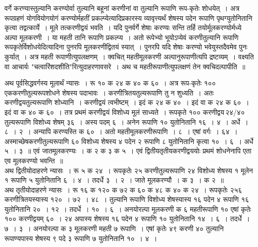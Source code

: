 \documentclass[11pt, openany]{book}
\begin{document}
 वर्गे करण्यास्तुल्यानि करण्योर्वा तुल्यानि बहूनां करणीनां वा तुल्यानि
रूपाणि रूप-कृतेः शोधयेत्~। अत्र रूपग्रहणं योगवियोगयोगं करण्योर्महतीं 
प्रकल्प्येत्यादिप्रकारस्य व्यावृत्त्यर्थं शेषस्य पदेन रूपाणि
पृथग्युतोनितानि कृत्वा तद्वत्कार्ये~। मूले तत्करणीद्वयं भवति~। यदि पुनर्वर्गे शेषाः करण्यः सन्ति तर्हि तयोर्मूलकरण्योर्मध्ये अल्पा मूलकरणी~। या महती तानि 
रूपाणि प्रकल्प्य~। अतो रूपेभ्यो भूयोऽप्येवं करणीतुल्यानि रूपाणि \;रूपकृतेर्विशोधयेदित्यादिना \;पुनरपि \;मूलकरणीद्वितयं \;स्यात्~। पुनरपि \;यदि शेषाः करण्यो भवेयुस्तदैवमेव पुनः कुर्यात्~। अत्र महती रूपाणीत्युपलक्षणम्~। क्वचित् महतीमूलकरणी अल्पानुरूपाणीत्यपि द्रष्टव्यम्~। वक्ष्यति वा
आचार्यः {\qt "चत्वारिंशदशीति"}रित्युदाहरणावसरे~। अथ च
महतीरूपाणीत्युपलक्षणं तेन क्वचिदल्पापीति~॥

\newpage%

 अथ पूर्वसिद्धवर्गस्य मूलार्थं न्यासः~। रू १० क २४ क ४० 
क ६०~। अत्र रूप-कृतेः १०० एककरणीतुल्यरूपशोधने शेषस्य पदाभावः~। करणीत्रितयतुल्यरूपाणि तु न शुध्यति~। अतः करणीद्वयतुल्यरूपाणि 
शोध्यानि~। करणीद्वयं त्वभीष्टम्~। इदं क २४ क ४०~। इदं वा क २४ क ६०~। इदं वा क ४० क ६०~। तत्र प्रथमं करणीद्वयं विशोध्य मूलं साध्यते~। रूपकृते १०० करणीद्वय\textendash \,२४/४०\textendash \,तुल्यरूपाणि 
विशोध्य शेषम् ३६~। अस्य पदम् ६~। अनेन रूपाणि १० युतोनितानि १६~। ४~। अर्धे~। ८~। २~। अन्यापि करण्यस्ति क ६०~। 
अतो महतीमूलकरणीरूपाणि~। ८~। एषां वर्गः~। ६४~। अस्माच्छेषकरणीतुल्यरूपाणि ६० विशोध्य शेषस्य ४ पदेन २ रूपाणि ८ युतोनितानि 
कृत्वा १०~। ६~। अर्धे ५~। ३~॥ एवं जातमूलकरण्यः~। क २ क ३ 
क ५~। एवं द्वितीयतृतीयकरणीद्वययोः प्रथमं शोधनेनापि एता एव मूलकरण्यो भवन्ति~॥ \\

\vspace{-3mm}
 अथ द्वितीयोदाहरणे न्यासः~। रू ५ क २४~। रूपकृतेः २५ 
करणीतुल्यरूपाणि २४ विशोध्य शेषस्य १ मूलेन १ रूपाणि ५ 
युतोनितानि ६~। ४~। तदर्धे ३~। २~। जाते मूलकरण्यौ~। क ३~। 
क २~॥ \\

\vspace{-3mm}
 अथ तृतीयोदाहरणे न्यासः~। रू १६ क १२० क ७२ क ६० 
क ४८ क ४० क २४~। रूपकृतेः २५६ करणीत्रितयस्यास्य १२०~। ७२~। ४८~। तुल्यानि रूपाणि विशोध्य शेषस्यास्य १६ पदेन ४ रूपाणि १६ युतोनितानि 
२०~। १२~। तदर्धे~। १०~। ६~। अनयोरल्पा मूलकरणी क ६ महतीरूपाणि १० एषां कृतेः १०० करणीद्वयम् ६०~। २४ अपास्य शेषस्य १६ 
पदेन ४ रूपाणि १० युतोनितानि १४~। ६~। तदर्धे~। ७~। ३~। अनयोरल्पा 
क ३ मूलकरणी महती ७ रूपाणि~। एषां कृतेः ४९ करणी ४० 
तुल्यानि रूपाण्यपास्य शेषस्य ९ पदे ३ रूपाणि ७ युतोनितानि १०~। ४~।
\newpage%
\end{document}
